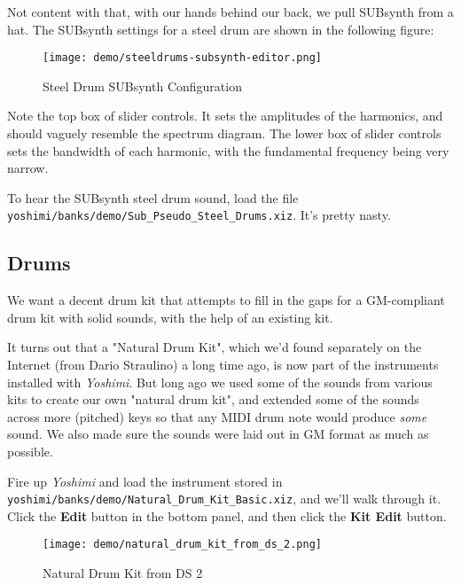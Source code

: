    Not content with that, with our hands behind our back, we pull
   SUBsynth from a hat.  The SUBsynth settings for a steel drum are shown in
   the following figure:

\begin{figure}[H]
   \centering 
   \texttt{[image: demo/steeldrums-subsynth-editor.png]}
   \caption{Steel Drum SUBsynth Configuration}
   \label{fig:cookbook_bank_steeldrum_subsynth}
\end{figure}

   Note the top box of slider controls.  It sets the amplitudes of
   the harmonics, and should vaguely resemble the spectrum diagram.
   The lower box of slider controls sets the bandwidth of each harmonic,
   with the fundamental frequency being very narrow.

   To hear the SUBsynth steel drum sound, load the file
   \texttt{yoshimi/banks/demo/Sub\_Pseudo\_Steel\_Drums.xiz}.
   It's pretty nasty.

\subsection{Drums}
\label{subsec:cookbook_instruments_drums}

   We want a decent drum kit that attempts to fill in the gaps for a
   GM-compliant drum kit with solid sounds, with
   the help of an existing kit.

   It turns out that a "Natural Drum Kit", which we'd found separately on
   the Internet (from Dario Straulino) a long time ago, is now part of the
   instruments installed with \textsl{Yoshimi}.
   But long ago we used some of the sounds
   from various kits to create our own "natural drum kit", and extended some
   of the sounds across more (pitched) keys so that any MIDI drum note would
   produce \textsl{some} sound.  We also made sure the sounds were laid out
   in GM format as much as possible.

   Fire up \textsl{Yoshimi} and load the instrument stored in
   \texttt{yoshimi/banks/demo/Natural\_Drum\_Kit\_Basic.xiz}, and we'll walk
   through it.  Click the \textbf{Edit} button in the bottom panel, and then
   click the \textbf{Kit Edit} button.

\begin{figure}[H]
   \centering 
   \texttt{[image: demo/natural\_drum\_kit\_from\_ds\_2.png]}
   \caption{Natural Drum Kit from DS 2}
   \label{fig:cookbook_bank_natural_drum_kit}
\end{figure}

